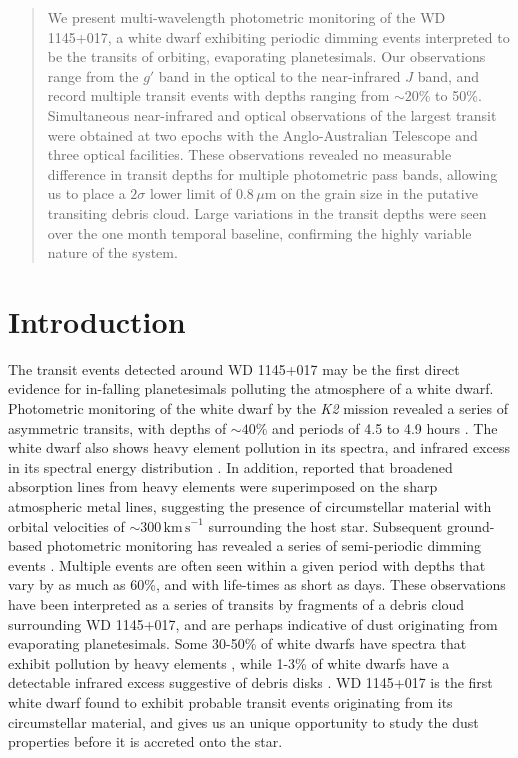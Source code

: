 \documentclass[iop,useAMES,usenatbig]{emulateapj}
\begin{document}
\begin{abstract}
We present multi-wavelength photometric monitoring of the WD 1145+017, a white dwarf exhibiting periodic dimming events interpreted to be the transits of orbiting, evaporating planetesimals. Our observations range from the $g'$ band in the optical to the near-infrared $J$ band, and record multiple transit events with depths ranging from $\sim 20$\% to 50\%. Simultaneous near-infrared and optical observations of the largest transit were obtained at two epochs with the Anglo-Australian Telescope and three optical facilities. These observations revealed no measurable difference in transit depths for multiple photometric pass bands, allowing us to place a $2\sigma$ lower limit of $0.8\,\mu\mathrm{m}$ on the grain size in the putative transiting debris cloud. Large variations in the transit depths were seen over the one month temporal baseline, confirming the highly variable nature of the system. 
\end{abstract}


\section{Introduction}
\label{sec:introduction}

The transit events detected around WD 1145+017 may be the first direct evidence for in-falling planetesimals polluting the atmosphere of a white dwarf. Photometric monitoring of the white dwarf by the \emph{K2} mission revealed a series of asymmetric transits, with depths of $\sim 40$\% and periods of 4.5 to 4.9 hours \citep{2015Natur.526..546V}. The white dwarf also shows heavy element pollution in its spectra, and infrared excess in its spectral energy distribution \citep{2015Natur.526..546V,2016ApJ...816L..22X}. In addition, \citet{2016ApJ...816L..22X} reported that broadened absorption lines from heavy elements were superimposed on the sharp atmospheric metal lines, suggesting the presence of circumstellar material with orbital velocities of $\sim 300\,\mathrm{km\,s}^{-1}$ surrounding the host star. Subsequent ground-based photometric monitoring has revealed a series of semi-periodic dimming events \citep{2015Natur.526..546V,2015arXiv151006434C,2016ApJ...818L...7G,2016MNRAS.tmp..406R,2016arXiv160308823A}. Multiple events are often seen within a given period with depths that vary by as much as 60\%, and with life-times as short as days. These observations have been interpreted as a series of transits by fragments of a debris cloud surrounding WD 1145+017, and are perhaps indicative of dust originating from evaporating planetesimals. Some 30-50\% of white dwarfs have spectra that exhibit pollution by heavy elements \citep[e.g.][]{2003ApJ...596..477Z,2010ApJ...722..725Z,2014A&A...566A..34K}, while 1-3\% of white dwarfs have a detectable infrared excess suggestive of debris disks \citep[e.g.][]{2007ApJS..171..206M,2009ApJ...694..805F,2011MNRAS.417.1210G,2011ApJS..197...38D}. WD 1145+017 is the first white dwarf found to exhibit probable transit events originating from its circumstellar material, and gives us an unique opportunity to study the dust properties before it is accreted onto the star. 
\end{document}
